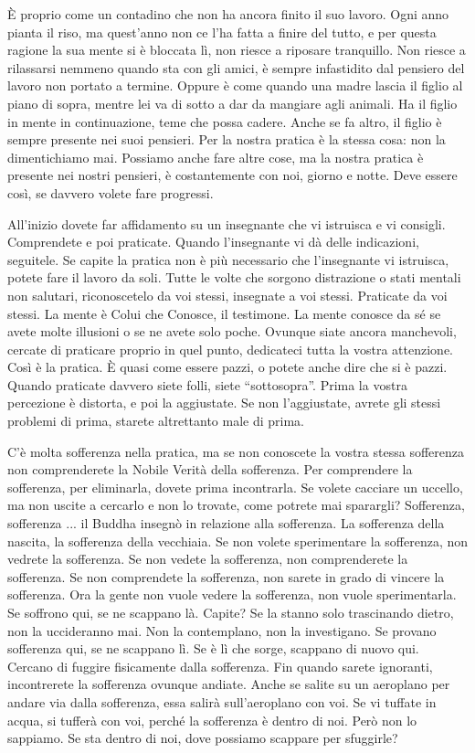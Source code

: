 È proprio come un contadino che non ha ancora finito il suo lavoro. Ogni
anno pianta il riso, ma quest'anno non ce l'ha fatta a finire del tutto,
e per questa ragione la sua mente si è bloccata lì, non riesce a
riposare tranquillo. Non riesce a rilassarsi nemmeno quando sta con gli
amici, è sempre infastidito dal pensiero del lavoro non portato a
termine. Oppure è come quando una madre lascia il figlio al piano di
sopra, mentre lei va di sotto a dar da mangiare agli animali. Ha il
figlio in mente in continuazione, teme che possa cadere. Anche se fa
altro, il figlio è sempre presente nei suoi pensieri. Per la nostra
pratica è la stessa cosa: non la dimentichiamo mai. Possiamo anche fare
altre cose, ma la nostra pratica è presente nei nostri pensieri, è
costantemente con noi, giorno e notte. Deve essere così, se davvero
volete fare progressi.

All'inizio dovete far affidamento su un insegnante che vi istruisca e vi
consigli. Comprendete e poi praticate. Quando l'insegnante vi dà delle
indicazioni, seguitele. Se capite la pratica non è più necessario che
l'insegnante vi istruisca, potete fare il lavoro da soli. Tutte le volte
che sorgono distrazione o stati mentali non salutari, riconoscetelo da
voi stessi, insegnate a voi stessi. Praticate da voi stessi. La mente è
Colui che Conosce, il testimone. La mente conosce da sé se avete molte
illusioni o se ne avete solo poche. Ovunque siate ancora manchevoli,
cercate di praticare proprio in quel punto, dedicateci tutta la vostra
attenzione. Così è la pratica. È quasi come essere pazzi, o potete anche
dire che si è pazzi. Quando praticate davvero siete folli, siete
``sottosopra''. Prima la vostra percezione è distorta, e poi la
aggiustate. Se non l'aggiustate, avrete gli stessi problemi di prima,
starete altrettanto male di prima.

C'è molta sofferenza nella pratica, ma se non conoscete la vostra stessa
sofferenza non comprenderete la Nobile Verità della sofferenza. Per
comprendere la sofferenza, per eliminarla, dovete prima incontrarla. Se
volete cacciare un uccello, ma non uscite a cercarlo e non lo trovate,
come potrete mai sparargli? Sofferenza, sofferenza ... il Buddha insegnò
in relazione alla sofferenza. La sofferenza della nascita, la sofferenza
della vecchiaia. Se non volete sperimentare la sofferenza, non vedrete
la sofferenza. Se non vedete la sofferenza, non comprenderete la
sofferenza. Se non comprendete la sofferenza, non sarete in grado di
vincere la sofferenza. Ora la gente non vuole vedere la sofferenza, non
vuole sperimentarla. Se soffrono qui, se ne scappano là. Capite? Se la
stanno solo trascinando dietro, non la uccideranno mai. Non la
contemplano, non la investigano. Se provano sofferenza qui, se ne
scappano lì. Se è lì che sorge, scappano di nuovo qui. Cercano di
fuggire fisicamente dalla sofferenza. Fin quando sarete ignoranti,
incontrerete la sofferenza ovunque andiate. Anche se salite su un
aeroplano per andare via dalla sofferenza, essa salirà sull'aeroplano
con voi. Se vi tuffate in acqua, si tufferà con voi, perché la
sofferenza è dentro di noi. Però non lo sappiamo. Se sta dentro di noi,
dove possiamo scappare per sfuggirle?

